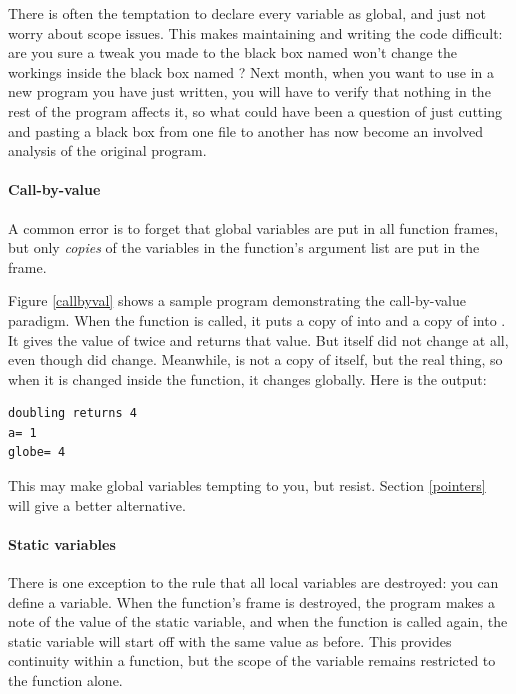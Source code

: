 There is often the temptation to declare every variable as global, and
just not worry about scope issues. This makes maintaining and writing
the code difficult: are you sure a tweak you made to the black box named
 won't change the workings inside the black box named
? Next month, when you want to use 
in a new program you have just written, you will have to verify that nothing
in the rest of the program affects it, so what could have been a question
of just cutting and pasting a black box from one file to another has
now become an involved analysis of the original program.  


\paragraph{Call-by-value} 
A common error is to forget that global variables are put in all function
frames, but only {\sl copies} of the variables in the function's argument
list are put in the frame.  

Figure \ref{callbyval} shows a sample program demonstrating the
call-by-value paradigm.  
When the  function is called, it puts a copy of  into  and a copy of 
into . It gives  the value of twice  and returns that value. But 
itself did not change at all, even though  did change. Meanwhile,  is not a copy of
itself, but the real thing, so when it is changed inside the function, it changes globally.
Here is the output:
\begin{lstlisting}
doubling returns 4
a= 1
globe= 4
\end{lstlisting}

This may make global variables tempting to you, but resist. Section \ref{pointers} will give a better
alternative.

\paragraph{\treesymbol Static variables} There is one exception to the rule that
all local variables are destroyed: you can define a 
variable. When the function's frame is destroyed, the program makes a
note of the value of the  static variable, and when the function is called
again, the static variable will start off with the same value
as before. This provides continuity within a function, but the scope
of the variable remains restricted to the function alone.

